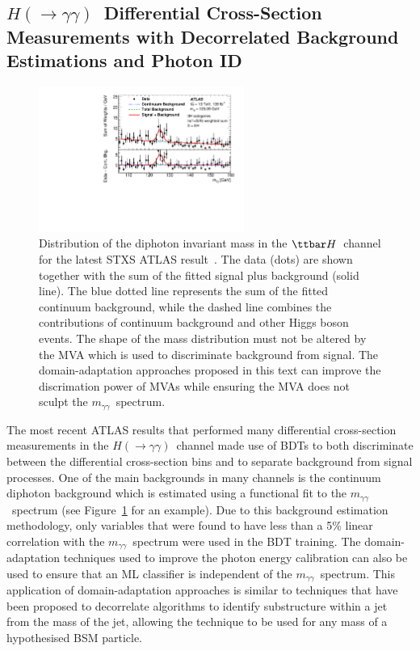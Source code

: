 \documentclass[letter, USenglish, 11pt, subfigure]{article}
\newcommand{\ttH}{\ensuremath{\ttbar H}}
\newcommand{\myy}{\ensuremath{m_{\gamma\gamma}}}
\newcommand{\hyy}{\ensuremath{H(\to\gamma\gamma)}}
\begin{document}
\subsection{\hyy\ Differential Cross-Section Measurements with Decorrelated Background Estimations and Photon ID}
\begin{figure}[ht]
  \centering
  \includegraphics[width=0.6\textwidth]{figures/tth_myy.pdf}
  \caption{\label{fig:myy} Distribution of the diphoton invariant mass in the \ttH\ channel for the latest STXS ATLAS result~\cite{ATLAS_STXS}. The data (dots) are shown together with the sum of the fitted signal plus background (solid line). The blue dotted line represents the sum of the fitted continuum background, while the dashed line combines the contributions of continuum background and other Higgs boson events. The shape of the mass distribution must not be altered by the MVA which is used to discriminate background from signal. The domain-adaptation approaches proposed in this text can improve the discrimation power of MVAs while ensuring the MVA does not sculpt the \myy\ spectrum.}
\end{figure}

The most recent ATLAS results that performed many differential cross-section measurements in the \hyy\ channel made use of BDTs to both discriminate between the differential cross-section bins and to separate background from signal processes. One of the main backgrounds in many channels is the continuum diphoton background which is estimated using a functional fit to the \myy\ spectrum (see Figure~\ref{fig:myy} for an example). Due to this background estimation methodology, only variables that were found to have less than a 5\% linear correlation with the \myy\ spectrum were used in the BDT training. The domain-adaptation techniques used to improve the photon energy calibration can also be used to ensure that an ML classifier is independent of the \myy\ spectrum. This application of domain-adaptation approaches is similar to techniques that have been proposed to decorrelate algorithms to identify substructure within a jet from the mass of the jet, allowing the technique to be used for any mass of a hypothesised BSM particle.
\end{document}
